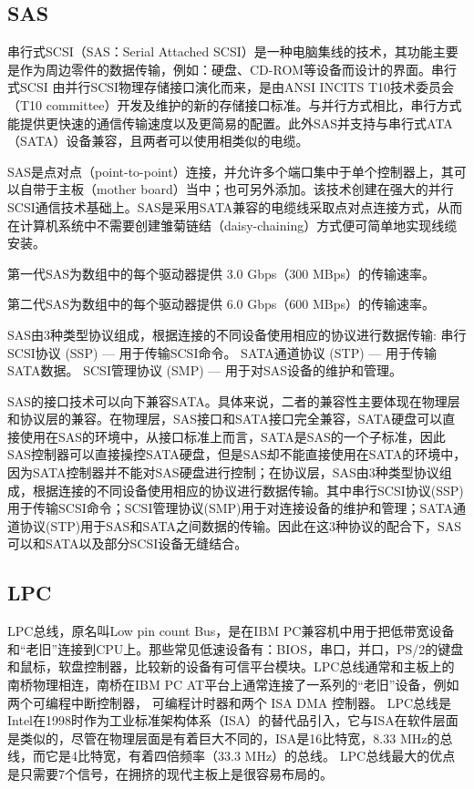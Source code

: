\subsection{SAS}
串行式SCSI（SAS：Serial Attached SCSI）是一种电脑集线的技术，其功能主要是作为周边零件的数据传输，例如：硬盘、CD-ROM等设备而设计的界面。串行式SCSI 由并行SCSI物理存储接口演化而来，是由ANSI INCITS T10技术委员会（T10 committee）开发及维护的新的存储接口标准。与并行方式相比，串行方式能提供更快速的通信传输速度以及更简易的配置。此外SAS并支持与串行式ATA（SATA）设备兼容，且两者可以使用相类似的电缆。

SAS是点对点（point-to-point）连接，并允许多个端口集中于单个控制器上，其可以自带于主板（mother board）当中；也可另外添加。该技术创建在强大的并行SCSI通信技术基础上。SAS是采用SATA兼容的电缆线采取点对点连接方式，从而在计算机系统中不需要创建雏菊链结（daisy-chaining）方式便可简单地实现线缆安装。

第一代SAS为数组中的每个驱动器提供 3.0 Gbps（300 MBps）的传输速率。

第二代SAS为数组中的每个驱动器提供 6.0 Gbps（600 MBps）的传输速率。

SAS由3种类型协议组成，根据连接的不同设备使用相应的协议进行数据传输:
串行SCSI协议 (SSP) — 用于传输SCSI命令。
SATA通道协议 (STP) — 用于传输SATA数据。
SCSI管理协议 (SMP) — 用于对SAS设备的维护和管理。

SAS的接口技术可以向下兼容SATA。具体来说，二者的兼容性主要体现在物理层和协议层的兼容。在物理层，SAS接口和SATA接口完全兼容，SATA硬盘可以直接使用在SAS的环境中，从接口标准上而言，SATA是SAS的一个子标准，因此SAS控制器可以直接操控SATA硬盘，但是SAS却不能直接使用在SATA的环境中，因为SATA控制器并不能对SAS硬盘进行控制；在协议层，SAS由3种类型协议组成，根据连接的不同设备使用相应的协议进行数据传输。其中串行SCSI协议(SSP)用于传输SCSI命令；SCSI管理协议(SMP)用于对连接设备的维护和管理；SATA通道协议(STP)用于SAS和SATA之间数据的传输。因此在这3种协议的配合下，SAS可以和SATA以及部分SCSI设备无缝结合。



\subsection{LPC}
LPC总线，原名叫Low pin count Bus，是在IBM PC兼容机中用于把低带宽设备和“老旧”连接到CPU上。那些常见低速设备有：BIOS，串口，并口，PS/2的键盘和鼠标，软盘控制器，比较新的设备有可信平台模块。LPC总线通常和主板上的南桥物理相连，南桥在IBM PC AT平台上通常连接了一系列的“老旧”设备，例如两个可编程中断控制器， 可编程计时器和两个 ISA DMA 控制器。 LPC总线是Intel在1998时作为工业标准架构体系（ISA）的替代品引入，它与ISA在软件层面是类似的，尽管在物理层面是有着巨大不同的，ISA是16比特宽，8.33 MHz的总线，而它是4比特宽，有着四倍频率（33.3 MHz）的总线。 LPC总线最大的优点是只需要7个信号，在拥挤的现代主板上是很容易布局的。


